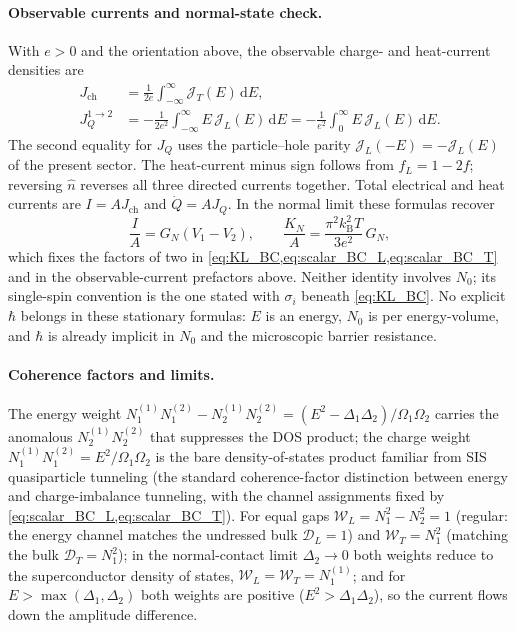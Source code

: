 \documentclass[
  aps,
  prb,
  preprint,
  superscriptaddress,
  longbibliography,
  nofootinbib
]{revtex4-2}
\newcommand{\dd}{\mathrm{d}}
\newcommand{\DOS}{N_1}
\newcommand{\fL}{f_L}
\begin{document}
\paragraph{Observable currents and normal-state check.}
With \(e>0\) and the orientation above, the observable charge- and
heat-current densities are
\begin{align}
  J_{\mathrm{ch}}
  &=
  \frac{1}{2e}\int_{-\infty}^{\infty}
  \mathcal J_T(E)\,\dd E,\\
  J_Q^{1\to2}
  &=
  -\frac{1}{2e^2}\int_{-\infty}^{\infty}
  E\,\mathcal J_L(E)\,\dd E
  =
  -\frac{1}{e^2}\int_0^\infty E\,\mathcal J_L(E)\,\dd E .
  \label{eq:KL_observable_currents}
\end{align}
The second equality for \(J_Q\) uses the particle--hole parity
\(\mathcal J_L(-E)=-\mathcal J_L(E)\) of the present sector.  The
heat-current minus sign follows from \(\fL=1-2f\); reversing
\(\hat n\) reverses all three directed currents together. Total electrical
and heat currents are \(I=A J_{\mathrm{ch}}\) and
\(\dot Q=A J_Q\). In the normal limit these formulas recover
\[
  \frac{I}{A}=G_N(V_1-V_2),
  \qquad
  \frac{K_N}{A}
  =
  \frac{\pi^2 k_{\mathrm B}^2T}{3e^2}\,G_N ,
\]
which fixes the factors of two in
\cref{eq:KL_BC,eq:scalar_BC_L,eq:scalar_BC_T} and in the observable-current
prefactors above. Neither identity involves \(N_0\); its single-spin
convention is the one stated with \(\sigma_i\) beneath \cref{eq:KL_BC}.
No explicit \(\hbar\) belongs in these stationary formulas: \(E\) is an
energy, \(N_0\) is per energy-volume, and \(\hbar\) is already implicit in
\(N_0\) and the microscopic barrier resistance.

\paragraph{Coherence factors and limits.} The energy weight
\(\DOS^{(1)}\DOS^{(2)}-N_2^{(1)}N_2^{(2)}
=(E^2-\Delta_1\Delta_2)/\Omega_1\Omega_2\) carries the anomalous
\(N_2^{(1)}N_2^{(2)}\) that suppresses the DOS product; the
charge weight \(\DOS^{(1)}\DOS^{(2)}=E^2/\Omega_1\Omega_2\) is the bare
density-of-states product familiar from SIS quasiparticle tunneling (the standard coherence-factor distinction between energy and
charge-imbalance tunneling, with the channel assignments fixed by
\cref{eq:scalar_BC_L,eq:scalar_BC_T}).
For equal gaps \(\mathcal W_L=\DOS^2-N_2^2=1\) (regular: the energy channel
matches the undressed bulk \(\mathcal D_L=1\)) and \(\mathcal W_T=\DOS^2\)
(matching the bulk \(\mathcal D_T=\DOS^2\)); in the normal-contact
limit \(\Delta_2\to0\) both weights reduce to the superconductor density of
states, \(\mathcal W_L=\mathcal W_T=\DOS^{(1)}\); and for
\(E>\max(\Delta_1,\Delta_2)\) both weights are positive
(\(E^2>\Delta_1\Delta_2\)), so the current flows
down the amplitude difference.
\end{document}
